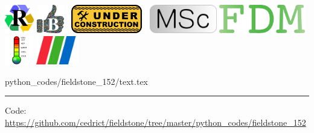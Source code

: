 \noindent
\includegraphics[height=1.25cm]{images/pictograms/replication}
\includegraphics[height=1.25cm]{images/pictograms/benchmark}
\includegraphics[height=1.25cm]{images/pictograms/under_construction}
\includegraphics[height=1.25cm]{images/pictograms/msc}
\includegraphics[height=1.25cm]{images/pictograms/FDM}
\includegraphics[height=1.25cm]{images/pictograms/temperature}
\includegraphics[height=1.25cm]{images/pictograms/paraview}


\begin{flushright} {\tiny {\color{gray} python\_codes/fieldstone\_152/text.tex}} \end{flushright}

%

\par\noindent\rule{\textwidth}{0.4pt}

\begin{center}
\inpython
{\small Code: \url{https://github.com/cedrict/fieldstone/tree/master/python_codes/fieldstone_152}}
\end{center}

